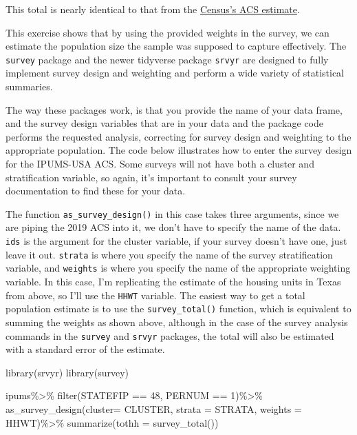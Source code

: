 \documentclass[
]{article}
\newenvironment{Shaded}{\begin{snugshade}}{\end{snugshade}}
\newcommand{\AttributeTok}[1]{\textcolor[rgb]{0.77,0.63,0.00}{#1}}
\newcommand{\DecValTok}[1]{\textcolor[rgb]{0.00,0.00,0.81}{#1}}
\newcommand{\FunctionTok}[1]{\textcolor[rgb]{0.00,0.00,0.00}{#1}}
\newcommand{\NormalTok}[1]{#1}
\newcommand{\SpecialCharTok}[1]{\textcolor[rgb]{0.00,0.00,0.00}{#1}}
\begin{document}
This total is nearly identical to that from the \href{https://data.census.gov/cedsci/table?t=Housing\&g=0400000US48\&y=2019\&tid=ACSDP1Y2019.DP04}{Census's ACS estimate}.

This exercise shows that by using the provided weights in the survey, we can estimate the population size the sample was supposed to capture effectively. The \texttt{survey} package and the newer tidyverse package \texttt{srvyr} are designed to fully implement survey design and weighting and perform a wide variety of statistical summaries.

The way these packages work, is that you provide the name of your data frame, and the survey design variables that are in your data and the package code performs the requested analysis, correcting for survey design and weighting to the appropriate population. The code below illustrates how to enter the survey design for the IPUMS-USA ACS. Some surveys will not have both a cluster and stratification variable, so again, it's important to consult your survey documentation to find these for your data.

The function \texttt{as\_survey\_design()} in this case takes three arguments, since we are piping the 2019 ACS into it, we don't have to specify the name of the data. \texttt{ids} is the argument for the cluster variable, if your survey doesn't have one, just leave it out. \texttt{strata} is where you specify the name of the survey stratification variable, and \texttt{weights} is where you specify the name of the appropriate weighting variable. In this case, I'm replicating the estimate of the housing units in Texas from above, so I'll use the \texttt{HHWT} variable. The easiest way to get a total population estimate is to use the \texttt{survey\_total()} function, which is equivalent to summing the weights as shown above, although in the case of the survey analysis commands in the \texttt{survey} and \texttt{srvyr} packages, the total will also be estimated with a standard error of the estimate.

\begin{Shaded}
\begin{Highlighting}[]
\FunctionTok{library}\NormalTok{(srvyr)}
\FunctionTok{library}\NormalTok{(survey)}

\NormalTok{ipums}\SpecialCharTok{\%\textgreater{}\%}
  \FunctionTok{filter}\NormalTok{(STATEFIP }\SpecialCharTok{==} \DecValTok{48}\NormalTok{, PERNUM }\SpecialCharTok{==} \DecValTok{1}\NormalTok{)}\SpecialCharTok{\%\textgreater{}\%}
  \FunctionTok{as\_survey\_design}\NormalTok{(}\AttributeTok{cluster=}\NormalTok{ CLUSTER,}
                   \AttributeTok{strata =}\NormalTok{ STRATA,}
                   \AttributeTok{weights =}\NormalTok{ HHWT)}\SpecialCharTok{\%\textgreater{}\%}
  \FunctionTok{summarize}\NormalTok{(}\AttributeTok{tothh =} \FunctionTok{survey\_total}\NormalTok{())}
\end{Highlighting}
\end{Shaded}
\end{document}

